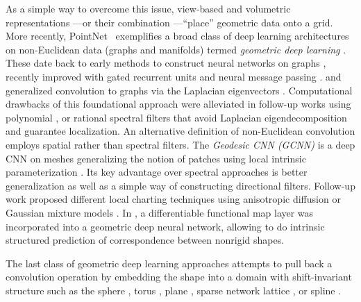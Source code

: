 \documentclass[acmtog]{acmart}
\begin{document}
As a simple way to overcome this issue, view-based \cite{su2015multi,wei2016dense} and volumetric representations \cite{maturana2015voxnet,wu20153d,klokov2017escape,tatarchenko2017octree}---or their combination \cite{qi2016volumetric}---``place'' geometric data onto a grid.
More recently, PointNet~\cite{DBLP:journals/corr/QiSMG16, DBLP:journals/corr/QiYSG17} exemplifies a broad class of deep learning architectures on non-Euclidean data (graphs and manifolds) termed 
\textit{geometric deep learning} \cite{bronstein2017geometric}. These date back to early methods to construct neural networks on graphs \cite{scarselli2009graph}, recently improved with gated recurrent units \cite{li2016gated} and neural message passing \cite{gilmer2017neural}.
\citet{bruna2013spectral} and \citet{henaff2015deep} generalized convolution to graphs via the Laplacian eigenvectors
\cite{shuman2013emerging}. 
Computational drawbacks of this foundational approach were alleviated in follow-up works using polynomial \cite{defferrard2016convolutional,kipf2016semi, monti2017geometric,monti2018motifnet}, or rational \cite{levie2017cayleynets} spectral filters that avoid Laplacian eigendecomposition and guarantee localization. 
An alternative definition of non-Euclidean convolution employs spatial rather than spectral filters. The \textit{Geodesic CNN (GCNN)} is a deep CNN on meshes generalizing the notion of patches using local intrinsic parameterization \cite{masci2015geodesic}. Its key advantage over spectral approaches is better generalization as well as a simple way of constructing directional filters. Follow-up work proposed different local charting techniques using anisotropic diffusion \cite{boscaini2016learning} or Gaussian mixture models \cite{velivckovic2017graph, monti2016geometric}.  In \cite{litany2017deep, halimi2018self}, a differentiable functional map \cite{ovsjanikov2012functional} layer was incorporated into a geometric deep neural network, allowing to do intrinsic structured prediction of correspondence between nonrigid shapes.

The last class of geometric deep learning approaches attempts to pull back a convolution operation by embedding the shape into a domain with shift-invariant structure such as the sphere \cite{sinha2016deep}, torus \cite{maron2017convolutional}, plane \cite{ezuz2017gwcnn}, sparse network lattice \cite{su18splatnet}, or spline \cite{splinecnn2018}.
\end{document}
